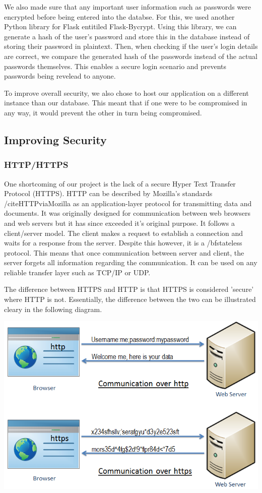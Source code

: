     We also made sure that any important user information such as passwords were encrypted before being entered into the databse.
    For this, we used another Python library for Flask entitiled Flask-Bycrypt. Using this library, we can generate a hash of the user's password and store this in the database instead of storing their password in plaintext. Then, when checking if 
    the user's login details are correct, we compare the generated hash of the passwords instead of the actual passwords themselves. This enables a secure login scenario and prevents passwords being revelead to anyone.

    To improve overall security, we also chose to host our application on a different instance than our database. This meant that if one were to be compromised in any way, it would prevent the other in turn being compromised.

    \subsection{Improving Security}
    \subsubsection{HTTP/HTTPS}
    One shortcoming of our project is the lack of a secure Hyper Text Transfer Protocol (HTTPS). HTTP can be described by Mozilla's standards /cite{HTTPviaMozilla} as an application-layer protocol 
    for transmitting data and documents. It was originally designed for communication between web browsers and web servers but it has since exceeded it's original purpose. It follows a client/server model. The client makes a 
    request to establish a connection and waits for a response from the server. Despite this however, it is a /bf{stateless} protocol. This means that once communication between server and client, the server forgets all information regarding
    the communication. It can be used on any reliable transfer layer such as TCP/IP or UDP.

    The difference between HTTPS and HTTP is that HTTPS is considered 'secure' where HTTP is not. Essentially, the difference between the two can be illustrated cleary in the following diagram.

    \begin{center}    
      \includegraphics{img/HTTPS.png}
    \end{center}

